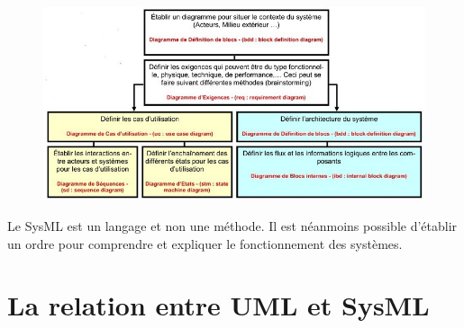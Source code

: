 \documentclass[12pt,a4paper]{report}
\begin{document}
\noindent \begin{flushleft}
	
	\begin{figure}[H]
		\centering
		\includegraphics[width=0.8\linewidth]{image25.png}
		\caption{}
		
	\end{figure}
	
	Le SysML est un langage et non une m\'{e}thode. Il est n\'{e}anmoins possible d'\'{e}tablir un ordre pour comprendre et expliquer le fonctionnement des syst\`{e}mes.
	
	\noindent 
	
	\noindent 
	
	\noindent 
	
	\noindent 
	
	\noindent 
	
	\noindent 
\end{flushleft}


\section{ La relation entre UML et SysML}
\end{document}

